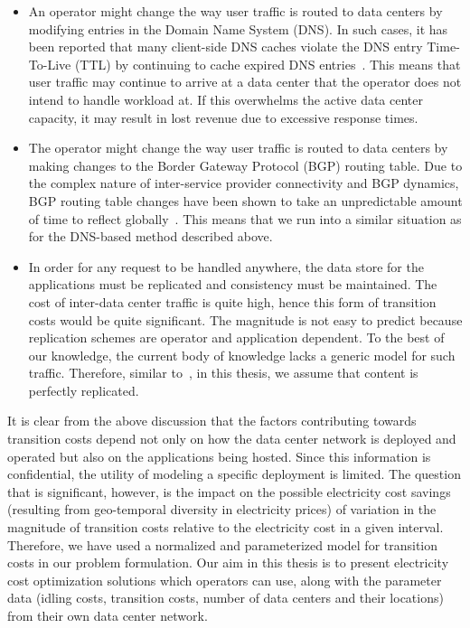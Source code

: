 \begin{itemize}
\item An operator might change the way user traffic is
    routed to data centers by modifying entries in the
    Domain Name System (DNS). In such cases, it has been
    reported that many client-side DNS caches violate the
    DNS entry Time-To-Live (TTL) by continuing to cache
    expired DNS entries~\cite{Pang_IMC_2004}. This means
    that user traffic may continue to arrive at a data
    center that the operator does not intend to handle
    workload at. If this overwhelms the active data center capacity, it may result in lost revenue due to excessive response times.
\item The operator might change the way user traffic is
    routed to data centers by making changes to the Border
    Gateway Protocol (BGP) routing table. Due to the
    complex nature of inter-service provider connectivity
    and BGP dynamics, BGP routing table changes have been
    shown to take an unpredictable amount of time to
    reflect globally~\cite{LabovitzSigcomm}. This means
    that we run into a similar situation as for the
    DNS-based method described above.
\item In order for any request to be handled anywhere, the
    data store for the applications must be replicated and
    consistency must be maintained.  The cost of inter-data center traffic is quite high, hence this form of transition costs would be quite significant. The magnitude is not easy to predict because replication schemes are operator and
    application dependent. To the best of our knowledge, the current body
of knowledge lacks a generic model for such traffic. Therefore, similar to~\cite{qureshi2009cutting}, in this thesis, we assume
that content is perfectly replicated.
\end{itemize}

It is clear from the above discussion that the factors contributing towards
transition costs depend not only on how the data center network
is deployed and operated but also on the applications being
hosted. Since this information is confidential, the utility of
modeling a specific deployment is limited. The question that is
significant, however, is the impact on the possible electricity
cost savings (resulting from geo-temporal diversity in
electricity prices) of variation in the magnitude of transition
costs relative to the electricity cost in a given interval. Therefore, we have used a normalized and parameterized model for transition costs in our problem formulation. Our aim in this thesis is to present
electricity cost optimization solutions which operators can
use, along with the parameter data (idling costs, transition
costs, number of data centers and their locations) from their
own data center network.

